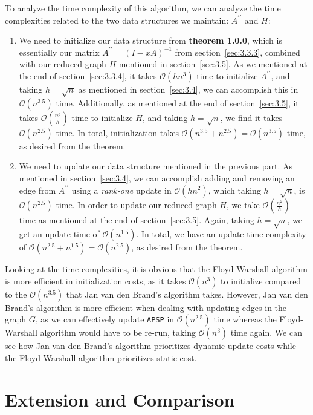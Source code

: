 \documentclass[12pt]{article}
\newcommand{\bigO}{\mathcal{O}}
\begin{document}
To analyze the time complexity of this algorithm, we can analyze the time complexities related to the two data structures we maintain: $A^{\prime \prime}$ and $H$:

\begin{enumerate}
    \item We need to initialize our data structure from \textbf{theorem 1.0.0}, which is essentially our matrix $A^{\prime \prime} = (I - xA)^{-1}$ from section~\ref{sec:3.3.3}, combined with our reduced graph $H$ mentioned in section~\ref{sec:3.5}. As we mentioned at the end of section~\ref{sec:3.3.4}, it takes $\bigO(h n^3)$ time to initialize $A^{\prime \prime}$, and taking $h = \sqrt{n}$ as mentioned in section~\ref{sec:3.4}, we can accomplish this in $\bigO(n^{3.5})$ time. Additionally, as mentioned at the end of section~\ref{sec:3.5}, it takes $\bigO(\frac{n^3}{h})$ time to initialize $H$, and taking $h = \sqrt{n}$, we find it takes $\bigO(n^{2.5})$ time. In total, initialization takes $\bigO(n^{3.5} + n^{2.5}) = \bigO(n^{3.5})$ time, as desired from the theorem.
    \item We need to update our data structure mentioned in the previous part. As mentioned in section~\ref{sec:3.4}, we can accomplish adding and removing an edge from $A^{\prime \prime}$ using a \emph{rank-one} update in $\bigO(h n^2)$, which taking $h = \sqrt{n}$, is $\bigO(n^{2.5})$ time. In order to update our reduced graph $H$, we take $\bigO(\frac{n^2}{h})$ time as mentioned at the end of section~\ref{sec:3.5}. Again, taking $h = \sqrt{n}$, we get an update time of $\bigO(n^{1.5})$. In total, we have an update time complexity of $\bigO(n^{2.5} + n^{1.5}) = \bigO(n^{2.5})$, as desired from the theorem.
\end{enumerate}

Looking at the time complexities, it is obvious that the Floyd-Warshall algorithm is more efficient in initialization costs, as it takes $\bigO(n^3)$ to initialize compared to the $\bigO(n^{3.5})$ that Jan van den Brand's algorithm takes. However, Jan van den Brand's algorithm is more efficient when dealing with updating edges in the graph $G$, as we can effectively update \texttt{APSP} in $\bigO(n^{2.5})$ time whereas the Floyd-Warshall algorithm would have to be re-run, taking $\bigO(n^3)$ time again. We can see how Jan van den Brand's algorithm prioritizes dynamic update costs while the Floyd-Warshall algorithm prioritizes static cost.

\section{Extension and Comparison}
\end{document}
